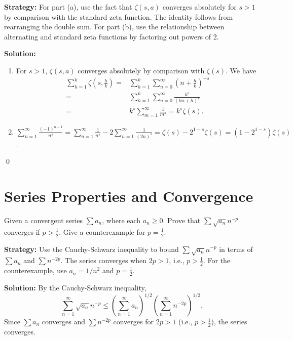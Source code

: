 \noindent\textbf{Strategy:} For part (a), use the fact that \(\zeta(s,a)\) converges absolutely for \(s>1\) by comparison with the standard zeta function. The identity follows from rearranging the double sum. For part (b), use the relationship between alternating and standard zeta functions by factoring out powers of 2.

\bigskip\noindent\textbf{Solution:}
\begin{enumerate}[label=(\alph*)]
\item For \(s > 1\), \(\zeta(s, a)\) converges absolutely by comparison with \(\zeta(s)\). We have
\begin{align*}  
\sum_{h=1}^{k} \zeta\left(s, \frac{h}{k}\right) =& \sum_{h=1}^{k} \sum_{n=0}^{\infty} \left(n + \frac{h}{k}\right)^{-s} \\
=& \sum_{h=1}^{k} \sum_{n=0}^{\infty} \frac{k^s}{(kn + h)^s} \\
=& k^s \sum_{m=1}^{\infty} \frac{1}{m^s} = k^s \zeta(s).
\end{align*}

\item \(\sum_{n=1}^{\infty} \frac{(-1)^{n-1}}{n^s} = \sum_{n=1}^{\infty} \frac{1}{n^s} - 2\sum_{n=1}^{\infty} \frac{1}{(2n)^s} = \zeta(s) - 2^{1-s}\zeta(s) = (1 - 2^{1-s})\zeta(s)\).
\end{enumerate}\qed

\section{Series Properties and Convergence}



\begin{problembox}
\begin{problemstatement}
Given a convergent series \(\sum a_n\), where each \(a_n \geq 0\). Prove that \(\sum \sqrt{a_n} n^{-p}\) converges if \(p > \frac{1}{2}\). Give a counterexample for \(p = \frac{1}{2}\).
\end{problemstatement}
\end{problembox}

\noindent\textbf{Strategy:} Use the Cauchy-Schwarz inequality to bound \(\sum \sqrt{a_n} n^{-p}\) in terms of \(\sum a_n\) and \(\sum n^{-2p}\). The series converges when \(2p>1\), i.e., \(p>\frac{1}{2}\). For the counterexample, use \(a_n=1/n^2\) and \(p=\frac{1}{2}\).

\bigskip\noindent\textbf{Solution:}
By the Cauchy-Schwarz inequality,
\[\sum_{n=1}^{\infty} \sqrt{a_n} n^{-p} \leq \left(\sum_{n=1}^{\infty} a_n\right)^{1/2} \left(\sum_{n=1}^{\infty} n^{-2p}\right)^{1/2}.\]
Since \(\sum a_n\) converges and \(\sum n^{-2p}\) converges for \(2p > 1\) (i.e., \(p > \frac{1}{2}\)), the series converges.

